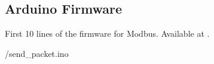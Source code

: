 \subsection{Arduino Firmware}
\label{sec:firmware-modbus}
\begin{ardcode}
  {First 10 lines of the firmware for Modbus.  Available at
    .}
  \label{ard:firmware-modbus}
  
  {\LocMODardcode/send_packet.ino}
\end{ardcode}
